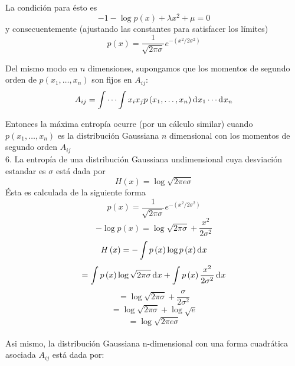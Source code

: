 La condici\'{o}n para \'{e}sto es
\begin{equation}
-1-\log p\left ( x \right )+\lambda x^{2}+\mu =0
\end{equation}
y consecuentemente (ajustando las constantes para satisfacer los l\'{i}mites)
\begin{equation}
p\left ( x \right )=\frac{1}{\sqrt{2\pi \sigma }}e^{-\left ( x^{2}/2\sigma ^{2} \right )}
\end{equation}

Del mismo modo en $n$ dimensiones, supongamos que los momentos de
segundo orden de $p\left ( x_{1}, \ldots ,x_{n} \right )$ son fijos en
$A_{ij}$:
\begin{equation}
A_{ij}=\int \cdots \int x_{i}x_{j}p\left ( x_{1}, \ldots ,x_{n} \right ) \diff x _{1}\cdots  \diff x_{n}
\end{equation}

Entonces la m\'{a}xima entrop\'ia ocurre (por un c\'{a}lculo similar)
cuando $p\left ( x_{1}, \ldots ,x_{n} \right )$ es la distribuci\'{o}n
Gaussiana $n$ dimensional con los momentos de segundo orden $A_{ij}$
\\
6. La entrop\'ia de una distribuci\'on Gaussiana undimensional cuya desviaci\'on estandar es $\sigma$ est\'a dada por
\begin{equation}
H\left ( x \right )=\log \sqrt{2\pi e\sigma }
\end{equation}
\'Esta es calculada de la siguiente forma
\begin{equation}
p\left ( x \right )=\frac{1}{\sqrt{2\pi \sigma }}e^{-\left ( x^{2}/2\sigma ^{2} \right )}
\end{equation}
\begin{equation}
-\log p\left ( x \right )=\log \sqrt{2\pi \sigma }+\frac{x^{2}}{2\sigma ^{2}}
\end{equation}
\begin{equation}
H\left ( x \right )=-\int p\left ( x \right )\log p\left ( x \right ) \diff x 
\end{equation}
\begin{equation}
=\int p\left ( x \right )\log \sqrt{2\pi \sigma } \diff x +\int p\left ( x \right )\frac{x^{2}}{2\sigma ^{2}} \diff x 
\end{equation}
\begin{equation}
=\log \sqrt{2\pi \sigma }+\frac{\sigma }{2\sigma ^{2}}
\end{equation}
\begin{equation}
=\log \sqrt{2\pi \sigma }+\log \sqrt{e}
\end{equation}
\begin{equation}
=\log \sqrt{2\pi e \sigma }
\end{equation}
\\
Asi mismo, la distribuci\'on Gaussiana n-dimensional con una forma cuadr\'atica asociada $A_{ij}$ est\'a dada por:

